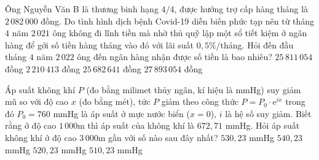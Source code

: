 \begin{ex}%
	Ông Nguyễn Văn B là thương binh hạng $ 4/4$, được hưởng trợ cấp hàng tháng là $ 2\,082\,000$ đồng. Do tình hình dịch bệnh Covid-19 diễn biến phức tạp nên từ tháng $ 4 $ năm $ 2\,021 $ ông không  đi lĩnh tiền mà nhờ thủ quỹ lập một sổ tiết kiệm ở ngân hàng để gởi số tiền hàng tháng vào đó với lãi suất $ 0{,}5\% /$tháng. Hỏi đến đầu tháng $ 4 $ năm $ 2\,022 $ ông đến ngân hàng nhận được số tiền là bao nhiêu?
	\choice 
		{\True $  25\,811\,054$ đồng}
		{$ 2\,210\,413$ đồng} 
		{$ 25\,682\,641$ đồng} 
		{$  27\,893\,054$ đồng}
\end{ex}

\begin{ex}%
	Áp suất không khí $P$ (đo bằng milimet thủy ngân, kí hiệu là mmHg) suy giảm mũ so với độ cao $x$ (đo bằng mét), tức $P$  giảm theo công thức $P = P_0\cdot\mathrm{e}^{ix}$ trong đó $P_0 = 760$ mmHg là áp suất ở mực nước biển ($x=0$), $i$ là hệ số suy giảm. Biết rằng ở độ cao $1\,000$m thì áp suất của không khí là $672{,}71$ mmHg. Hỏi áp suất không khí ở độ cao $3\,000$m gần với số nào sau đây nhất?
	 \choice
		 {\True $530{,}23$ mmHg}
		{$540{,}23$ mmHg} 
		{$520{,}23$ mmHg} 
		{$510{,}23$  mmHg}
\end{ex}

